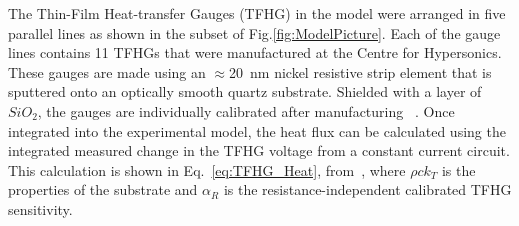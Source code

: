 \documentclass{AIAA}
\begin{document}


The Thin-Film Heat-transfer Gauges (TFHG) in the model were arranged in five parallel lines as shown in the subset of Fig.\ref{fig:ModelPicture}.
Each of the gauge lines contains 11 TFHGs that were manufactured at the Centre for Hypersonics. %
These gauges are made using an $\approx$\SI{20}{\nano\meter} nickel resistive strip element that is sputtered onto an optically smooth quartz substrate.
Shielded with a layer of $SiO_2$, the gauges are individually calibrated after manufacturing ~\cite{Wise_Thesis}.
Once integrated into the experimental model, the heat flux can be calculated using the integrated measured change in the TFHG voltage from a constant current circuit.
This calculation is shown in Eq.~\ref{eq:TFHG_Heat}, from~\cite{Wise_Thesis,Schultz_Book}, where $\rho c k_T$ is the properties of the substrate and $\alpha_R$ is the resistance-independent calibrated TFHG sensitivity.



\end{document}
